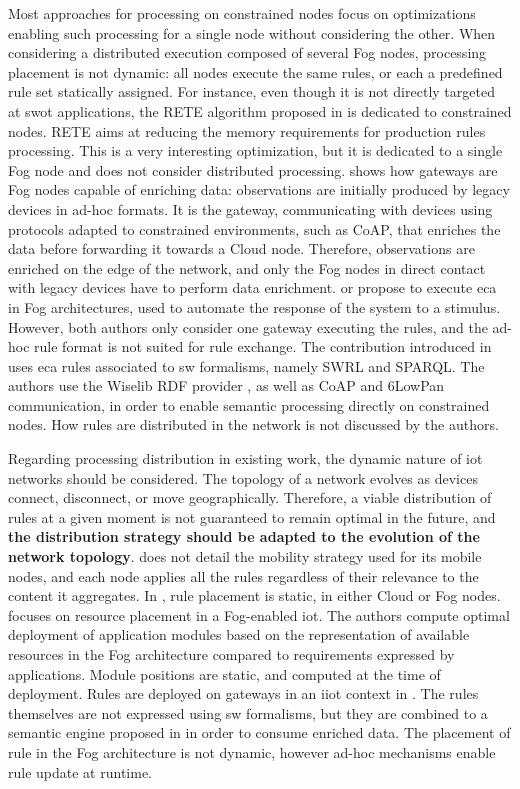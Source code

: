 \documentclass{iosart2c}
\begin{document}
Most approaches for processing on constrained nodes focus on optimizations enabling such processing for a single node without considering the other.
When considering a distributed execution composed of several Fog nodes, processing placement is not dynamic: all nodes execute the same rules, or each a predefined rule set statically assigned.
For instance, even though it is not directly targeted at \gls{swot} applications, the RETE algorithm proposed in \cite{Woensel2018} is dedicated to constrained nodes.
RETE aims at reducing the memory requirements for production rules processing.
This is a very interesting optimization, but it is dedicated to a single Fog node and does not consider distributed processing.
\cite{Desai2015} shows how gateways are Fog nodes capable of enriching data: observations are initially produced by legacy devices in ad-hoc formats. 
It is the gateway, communicating with devices using protocols adapted to constrained environments, such as CoAP, that enriches the data before forwarding it towards a Cloud node. 
Therefore, observations are enriched on the edge of the network, and only the Fog nodes in direct contact with legacy devices have to perform data enrichment.
\cite{Lee2016} or \cite{KaedKBHS18} propose to execute \gls{eca} in Fog architectures, used to automate the response of the system to a stimulus. 
However, both authors only consider one gateway executing the rules, and the ad-hoc rule format is not suited for rule exchange.
The contribution introduced in \cite{IoannisChatzigiannakis129} uses \gls{eca} rules associated to \gls{sw} formalisms, namely SWRL and SPARQL.
The authors use the Wiselib RDF provider \cite{Hasemann2012}, as well as CoAP and 6LowPan communication, in order to enable semantic processing directly on constrained nodes.
How rules are distributed in the network is not discussed by the authors.

Regarding processing distribution in existing work, the dynamic nature of \gls{iot} networks should be considered. 
The topology of a network evolves as devices connect, disconnect, or move geographically.
Therefore, a viable distribution of rules at a given moment is not guaranteed to remain optimal in the future, and \textbf{the distribution strategy should be adapted to the evolution of the network topology}.
\cite{Maarala2017} does not detail the mobility strategy used for its mobile nodes, and each node applies all the rules regardless of their relevance to the content it aggregates.
In \cite{Su2018}, rule placement is static, in either Cloud or Fog nodes. 
\cite{Taneja2017} focuses on resource placement in a Fog-enabled \gls{iot}. 
The authors compute optimal deployment of application modules based on the representation of available resources in the Fog architecture compared to requirements expressed by applications. 
Module positions are static, and computed at the time of deployment.
Rules are deployed on gateways in an \gls{iiot} context in \cite{Kaed2018}.
The rules themselves are not expressed using \gls{sw} formalisms, but they are combined to a semantic engine proposed in \cite{Kaed2016} in order to consume enriched data.
The placement of rule in the Fog architecture is not dynamic, however ad-hoc mechanisms enable rule update at runtime.
\end{document}
